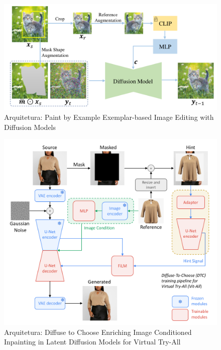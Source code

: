 \documentclass[aspectratio=169]{beamer}
\begin{document}
\begin{frame}

    \begin{figure}
        \centering
        \includegraphics[width=\textwidth]{figs/paintbyexample.png}
        \caption{Arquitetura: Paint by Example Exemplar-based Image Editing with Diffusion Models}
    \end{figure}   
\end{frame}

\begin{frame}

    \begin{figure}
        \centering
        \includegraphics[scale=.2]{figs/diffusetochoose.png}
        \caption{Arquitetura: Diffuse to Choose Enriching Image Conditioned Inpainting in Latent Diffusion Models for Virtual Try-All}
    \end{figure}   
\end{frame}
\end{document}
